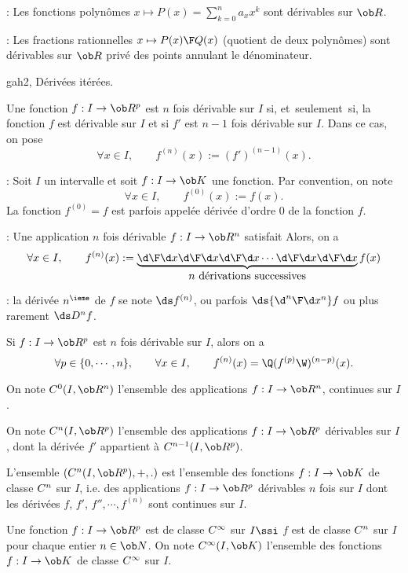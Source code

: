 \Remarque : Les fonctions polynômes $x\mapsto P(x)=\sum_{k=0}^n a_xx^k$ sont dérivables sur $\ob R$. 
\bigskip

\Remarque  : Les fractions rationnelles $x\mapsto {P(x)\F Q(x)}$ (quotient de deux polynômes) sont dérivables sur $\ob R$ privé des points annulant le dénominateur. 
\bigskip


\Subsection gah2, Dérivées itérées. 

\Definition [$I$ intervalle, $n\ge2$] 
Une fonction $f:I\to\ob R^p$ est $n$ fois dérivable sur $I$ si, et~seulement~si, la fonction $f$ est dérivable sur $I$ et si $f'$ est $n-1$ fois 
dérivable sur $I$. Dans ce cas, on pose 
$$
\forall x\in I,\qquad f^{(n)}(x):=(f')^{(n-1)}(x). 
$$


\Remarque : Soit $I$ un intervalle et soit $f:I\to\ob K$ une fonction. Par convention, on note 
$$
\forall x\in I, \qquad f^{(0)}(x):=f(x).
$$
La fonction $f^{(0)}=f$ est parfois appelée dérivée d'ordre $0$ de la fonction $f$. 
\bigskip

\Remarque : Une application $n$ fois dérivable $f:I\to\ob R^n$ satisfait 
Alors, on a 
$$
\forall x\in I, \qquad f^{(n)}(x):=\underbrace{{\d\F \d x}{\d\F\d x}{\d\F \d x}\cdots{\d\F \d x}{\d\F \d x}}_{\mbox{$n$ dérivations successives}}f(x)
$$

\Remarque : la dérivée $n^\ieme$ de $f$ se note $\ds f^{(n)}$, ou parfois $\ds{\d^n\F\d x^n}f$ ou plus rarement $\ds D^nf$. 
\bigskip

\Propriete [$I$ intervalle, $n\ge2$]
Si $f:I\to\ob R^p$ est $n$ fois dérivable sur $I$, alors on a 
$$
\forall p\in\{0,\cdots, n\}, \qquad \forall x\in I, \qquad f^{(n)}(x)=\Q(f^{(p)}\W)^{(n-p)}(x).
$$

On note $\sc C^0(I,\ob R^n)$ l'ensemble des applications $f:I\to\ob R^n$, continues sur $I$. 

On note $\sc C^n(I,\ob R^p)$ l'ensemble des applications $f:I\to\ob R^p$ 
dérivables sur $I$, dont la dérivée $f'$ appartient à $\sc C^{n-1}(I,\ob R^p)$. 


L'ensemble $(\sc C^n(I,\ob R^p), +, .)$ est l'ensemble des fonctions $f:I\to\ob K$ de classe $\sc C^n$ sur $I$, i.e. des applications $f:I\to\ob R^p$ dérivables $n$ fois sur $I$ dont les dérivées $f$, $f'$, $f'', \cdots, f^{(n)}$ sont continues sur $I$. 

Une fonction $f:I\to\ob R^p$ est de classe $\sc C^\infty$ sur $I\ssi$ $f$ est de classe $\sc C^n$ sur $I$ pour chaque entier $n\in\ob N$. \pn
On note $\sc C^\infty(I,\ob K)$ l'ensemble des fonctions $f:I\to\ob K$ de classe $\sc C^\infty$ sur $I$. 


